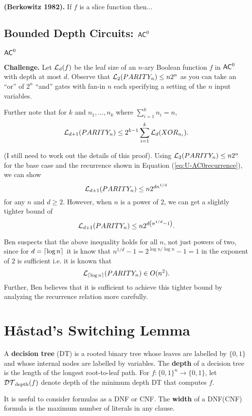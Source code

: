 \documentclass[11pt]{article}
\begin{document}
		\begin{theorem}
			\textbf{(Berkowitz 1982).} If $f$ is a slice function then...
		\end{theorem}
	
	\subsection{Bounded Depth Circuits: \texorpdfstring{$\mathsf{AC}^0$}{AC0}}
	
	\begin{definition}
		$\mathsf{AC}^0$
	\end{definition}
	
	\textbf{Challenge.} Let $\mathcal{L}_{d}(f)$ be the leaf size of an $n$-ary Boolean function $f$ in $\mathsf{AC}^0$ with depth at most $d$. Observe that $\mathcal{L}_2(PARITY_n) \leq n2^n$ as you can take an ``or'' of $2^n$ ``and'' gates with fan-in $n$ each specifying a setting of the $n$ input variables.
	
	Further note that for $k$ and $n_1, ..., n_k$ where $\sum_{i = 1}^{k} n_i = n$, 
	\begin{equation}
	\label{eq:U-AC0recurrence}
	\mathcal{L}_{d+1}(PARITY_n) \leq 2^{k-1}\sum_{i = 1}^{k}\mathcal{L}_{d}(XOR_{n_i}).
	\end{equation}
	
	(I still need to work out the details of this proof). Using $\mathcal{L}_2(PARITY_n) \leq n2^n$ for the base case and the recurrence shown in Equation (\ref{eq:U-AC0recurrence}), we can show 
	\[\mathcal{L}_{d+1}(PARITY_n) \leq n2^{dn^{1/d}}\]
	for any $n$ and $d \geq 2$. However, when $n$ is a power of $2$, we can get a slightly tighter bound of 
	\[\mathcal{L}_{d+1}(PARITY_n) \leq n2^{d\left(n^{1/d} - 1\right)}.\]
	
	Ben suspects that the above inequality holds for all $n$, not just powers of two, since for $d = \lceil\log n\rceil$ it is know that $n^{1/d} - 1 = 2^{\log n/ \log n} - 1 = 1$ in the exponent of $2$ is sufficient i.e. it is known that
	\[\mathcal{L}_{\lceil\log n\rceil}(PARITY_n) \in O(n^2).\]
	Further, Ben believes that it is sufficient to achieve this tighter bound by analyzing the recurrence relation more carefully. 
	
	\section{H\aa stad's Switching Lemma}
	\begin{definition}
		\label{def:decisiontrees}
		A \textbf{decision tree} (DT) is a rooted binary tree whose leaves are labelled by $\{0,1\}$ and whose internal nodes are labelled by variables. The \textbf{depth} of a decision tree is the length of the longest root-to-leaf path. For $f: \{0,1\}^n \rightarrow \{0,1\}$, let $\mathcal{DT}_{\mathrm{depth}}(f)$ denote depth of the minimum depth DT that computes $f$. 
				
		It is useful to consider formulas as a DNF or CNF. The \textbf{width} of a DNF(CNF) formula is the maximum number of literals in any clause. 
	\end{definition}
	
\end{document}
